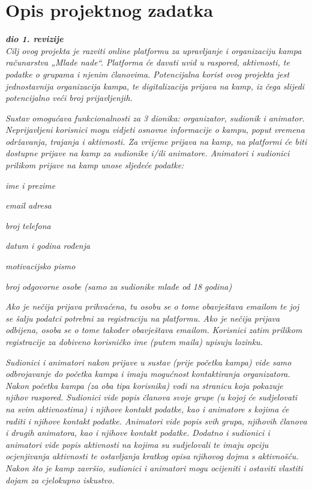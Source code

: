 \chapter{Opis projektnog zadatka}
		
		\textbf{\textit{dio 1. revizije}}\\
		
		\textit{Cilj ovog projekta je razviti online platformu za upravljanje i organizaciju kampa računarstva „Mlade nade“. Platforma će davati uvid u raspored, aktivnosti, te podatke o grupama i njenim članovima. Potencijalna korist ovog projekta jest jednostavnija organizacija kampa, te digitalizacija prijava na kamp, iz čega slijedi potencijalno veći broj prijavljenjih.}
		
		\textit{Sustav omogućava funkcionalnosti za 3 dionika: organizator, sudionik i animator. Neprijavljeni korisnici mogu vidjeti osnovne informacije o kampu, poput vremena održavanja, trajanja i aktivnosti. Za vrijeme prijava na kamp, na platformi će biti dostupne prijave na kamp za sudionike i/ili animatore. Animatori i sudionici prilikom prijave na kamp unose sljedeće podatke:}
		\begin{packed_item}
			\item \textit{ime i prezime}
			\item \textit{email adresa}
			\item \textit{broj telefona}
			\item \textit{datum i godina rođenja}
			\item \textit{motivacijsko pismo}
			\item \textit{broj odgovorne osobe (samo za sudionike mlađe od 18 godina)}
		\end{packed_item}
	
		\textit{Ako je nečija prijava prihvaćena, tu osobu se o tome obavještava emailom te joj se šalju podatci potrebni za registraciju na platformu. Ako je nečija prijava odbijena, osoba se o tome također obavještava emailom. Korisnici zatim prilikom registracije za dobiveno korisničko ime (putem maila) upisuju lozinku.}
		
		\textit{Sudionici i animatori nakon prijave u sustav (prije početka kampa) vide samo odbrojavanje do početka kampa i imaju mogućnost kontaktiranja organizatora. Nakon početka kampa (za oba tipa korisnika) vodi na stranicu koja pokazuje njihov raspored. Sudionici vide popis članova svoje grupe (u kojoj će sudjelovati na svim aktivnostima) i njihove kontakt podatke, kao i animatore s kojima će raditi i njihove kontakt podatke. Animatori vide popis svih grupa, njihovih članova i drugih animatora, kao i njihove kontakt podatke. Dodatno i sudionici i animatori vide popis aktivnosti na kojima su sudjelovali te imaju opciju ocjenjivanja aktivnosti te ostavljanja kratkog opisa njihovog dojma s aktivnošću. Nakon što je kamp završio, sudionici i animatori mogu ocijeniti i ostaviti vlastiti dojam za cjelokupno iskustvo. }
		
